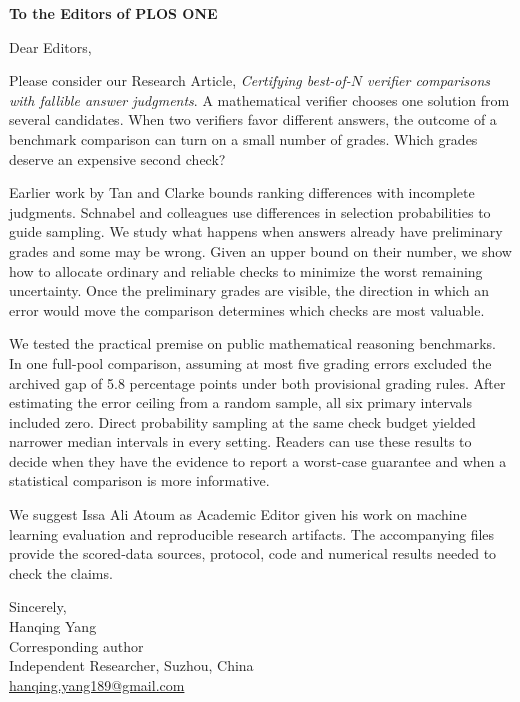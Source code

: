 \documentclass[11pt,letterpaper]{article}
\begin{document}
\textbf{To the Editors of PLOS ONE}

Dear Editors,

Please consider our Research Article, \emph{Certifying best-of-$N$ verifier comparisons with fallible answer judgments}. A mathematical verifier chooses one solution from several candidates. When two verifiers favor different answers, the outcome of a benchmark comparison can turn on a small number of grades. Which grades deserve an expensive second check?

Earlier work by Tan and Clarke bounds ranking differences with incomplete judgments. Schnabel and colleagues use differences in selection probabilities to guide sampling. We study what happens when answers already have preliminary grades and some may be wrong. Given an upper bound on their number, we show how to allocate ordinary and reliable checks to minimize the worst remaining uncertainty. Once the preliminary grades are visible, the direction in which an error would move the comparison determines which checks are most valuable.

We tested the practical premise on public mathematical reasoning benchmarks. In one full-pool comparison, assuming at most five grading errors excluded the archived gap of 5.8 percentage points under both provisional grading rules. After estimating the error ceiling from a random sample, all six primary intervals included zero. Direct probability sampling at the same check budget yielded narrower median intervals in every setting. Readers can use these results to decide when they have the evidence to report a worst-case guarantee and when a statistical comparison is more informative.

We suggest Issa Ali Atoum as Academic Editor given his work on machine learning evaluation and reproducible research artifacts. The accompanying files provide the scored-data sources, protocol, code and numerical results needed to check the claims.

Sincerely,\\
Hanqing Yang\\
Corresponding author\\
Independent Researcher, Suzhou, China\\
\href{mailto:hanqing.yang189@gmail.com}{hanqing.yang189@gmail.com}
\end{document}
